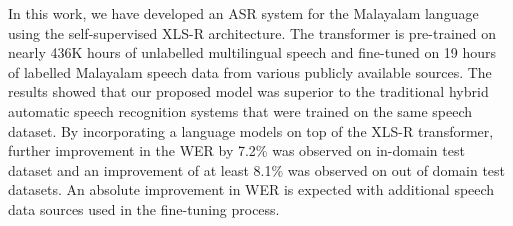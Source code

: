 \documentclass[runningheads]{llncs}
\begin{document}
In this work, we have developed an ASR system for the Malayalam language using the self-supervised XLS-R architecture. The transformer is pre-trained on nearly 436K hours of unlabelled multilingual speech and fine-tuned on 19 hours of labelled Malayalam speech data from various publicly available sources. The results showed that our proposed model was superior to the traditional hybrid automatic speech recognition systems that were trained on the same speech dataset. By incorporating a language models on top of the XLS-R transformer, further improvement in the WER by  7.2\% was observed  on in-domain test dataset and an improvement of at least 8.1\% was observed on out of domain test datasets. An absolute improvement in WER is expected with additional speech data sources used in the fine-tuning process.







\end{document}
